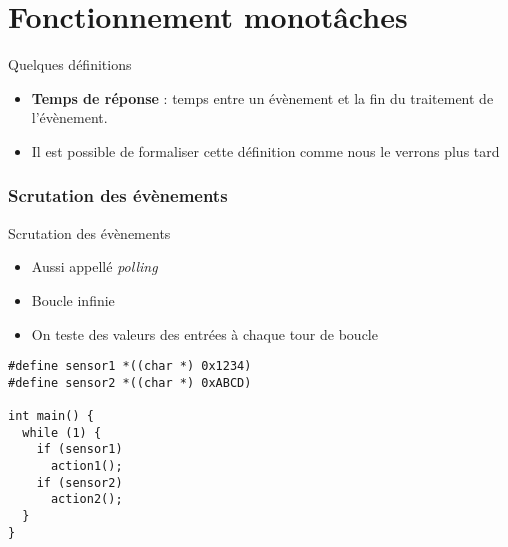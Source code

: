 %
%
%

\part{Fonctionnement monotâches}

\begin{frame}
  \partpage
\end{frame}

\begin{frame}
  \tableofcontents[currentpart]
\end{frame}

\begin{frame}{Quelques définitions}
  \begin{itemize}
  \item \textbf{Temps de réponse} : temps entre un évènement et la fin
    du traitement de l'évènement.
  \item Il est  possible de formaliser cette définition  comme nous le
    verrons plus tard
  \end{itemize}
\end{frame}

\section{Scrutation des évènements}
\begin{frame}[fragile]{Scrutation des évènements}
  \begin{itemize}
  \item Aussi appellé \emph{polling}
  \item Boucle infinie
  \item On teste des valeurs des entrées à chaque tour de boucle
  \end{itemize}
  \begin{lstlisting}
#define sensor1 *((char *) 0x1234)
#define sensor2 *((char *) 0xABCD)

int main() {
  while (1) {
    if (sensor1)
      action1();
    if (sensor2)
      action2();
  }
}
  \end{lstlisting}
\end{frame}

